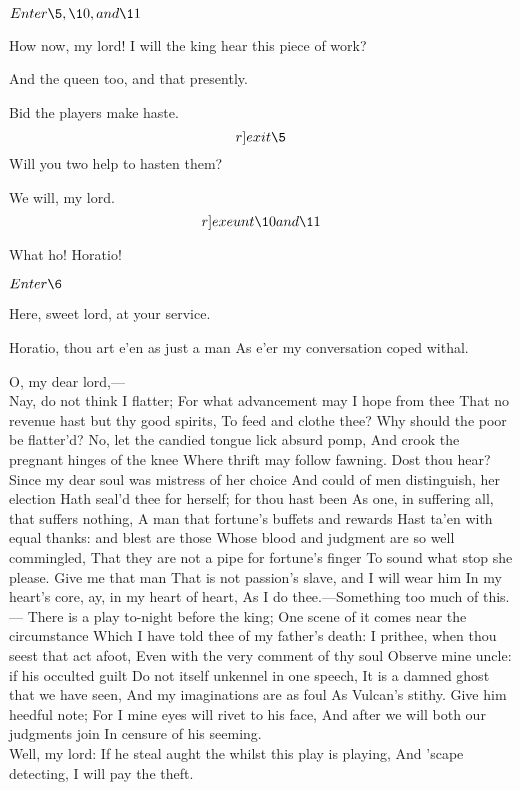\documentclass[11pt]{book}
\begin{document}
	\(Enter \5, \10, and \11\)

	How now, my lord! I will the king hear this piece of work?

\endProsa

\5	And the queen too, and that presently.

\1	Bid the players make haste. 	\[r]exit \5\]
	Will you two help to hasten them?

   We will, my lord. 	\[r]exeunt \10 and \11\]

\1	What ho! Horatio!

	\(Enter \6\)

\6	Here, sweet lord, at your service.

\1	Horatio, thou art e'en as just a man
	As e'er my conversation coped withal.

\6	O, my dear lord,--- \\

\1	                  Nay, do not think I flatter;
	For what advancement may I hope from thee
	That no revenue hast but thy good spirits,
	To feed and clothe thee? Why should the poor be flatter'd?
	No, let the candied tongue lick absurd pomp,
	And crook the pregnant hinges of the knee
	Where thrift may follow fawning. Dost thou hear?
	Since my dear soul was mistress of her choice
	And could of men distinguish, her election
	Hath seal'd thee for herself; for thou hast been
	As one, in suffering all, that suffers nothing,
	A man that fortune's buffets and rewards
	Hast ta'en with equal thanks: and blest are those
	Whose blood and judgment are so well commingled,
	That they are not a pipe for fortune's finger
	To sound what stop she please. Give me that man
	That is not passion's slave, and I will wear him
	In my heart's core, ay, in my heart of heart,
	As I do thee.---Something too much of this.---
	There is a play to-night before the king;
	One scene of it comes near the circumstance
	Which I have told thee of my father's death:
	I prithee, when thou seest that act afoot,
	Even with the very comment of thy soul
	Observe mine uncle: if his occulted guilt
	Do not itself unkennel in one speech,
	It is a damned ghost that we have seen,
	And my imaginations are as foul
	As Vulcan's stithy. Give him heedful note;
	For I mine eyes will rivet to his face,
	And after we will both our judgments join
	In censure of his seeming. \\

\6	Well, my lord:
	If he steal aught the whilst this play is playing,
	And 'scape detecting, I will pay the theft.
\end{document}
